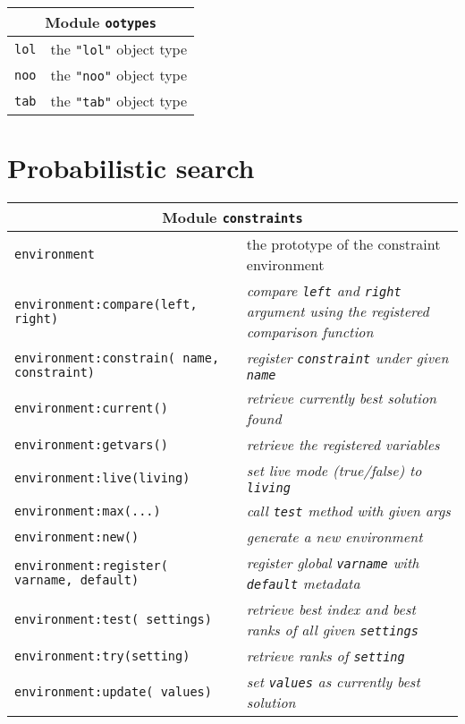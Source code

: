 \begin{appendices}
\begin{table}[H]
\begin{tabular}{|p{5cm}|p{8cm}|}
\hline
\multicolumn{2}{|c|}{Module \texttt{ootypes}}\\
\hline
\hline
\texttt{lol} & the \texttt{"lol"} object type \\
\hline
\texttt{noo} & the \texttt{"noo"} object type \\
\hline
\texttt{tab} & the \texttt{"tab"} object type \\
\hline
\end{tabular}
\end{table}


\section{Probabilistic search}

\begin{table}[H]
\begin{tabular}{|p{5cm}|p{8cm}|}
\hline
\multicolumn{2}{|c|}{Module \texttt{constraints}}\\
\hline
\hline
\texttt{environment} & the prototype of the constraint environment \\
\hline
\texttt{environment:compare(left, right)} & \emph{compare \texttt{left} and \texttt{right} argument using the registered comparison function}\\
\hline
\texttt{environment:constrain( name, constraint)} & \emph{register \texttt{constraint} under given \texttt{name}}\\
\hline
\texttt{environment:current()} & \emph{retrieve currently best solution found}\\
\hline
\texttt{environment:getvars()} & \emph{retrieve the registered variables}\\
\hline
\texttt{environment:live(living)} & \emph{set live mode (true/false) to \texttt{living}}\\
\hline
\texttt{environment:max(...)} & \emph{call \texttt{test} method with given args}\\
\hline
\texttt{environment:new()} & \emph{generate a new environment}\\
\hline
\texttt{environment:register( varname, default)} & \emph{register global \texttt{varname} with \texttt{default} metadata}\\
\hline
\texttt{environment:test( settings)} & \emph{retrieve best index and best ranks of all given \texttt{settings}}\\
\hline
\texttt{environment:try(setting)} & \emph{retrieve ranks of \texttt{setting}}\\
\hline
\texttt{environment:update( values)} & \emph{set \texttt{values} as currently best solution}\\
\hline
\end{tabular}
\end{table}


\end{appendices}
